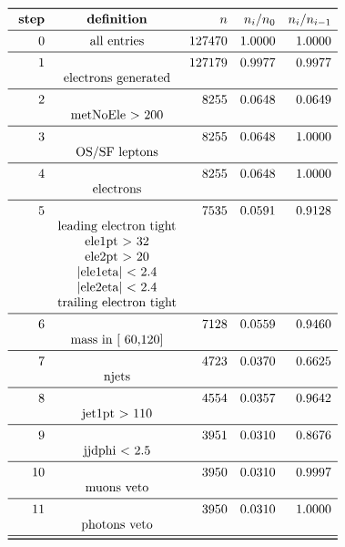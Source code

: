 \documentclass[11pt,a4paper]{article}
\begin{document}
\begin{table}
\caption{\emph{Entries after each selection step, normalised to 5.00 $fb^{-1}$; n is the number of entries after the i-th selection step; Note that cuts on second jet are applied only if a second jet exists with $p_t$ > 30\,GeV.}}
\[
\begin{array}{rcrrr}
\toprule
\ \textbf{step}& \textbf{definition}  & n  &  n_i/n_0 & n_i/n_{i-1}  \\ 
\midrule
 0  & \text{all entries} & 127470 & 1.0000 & 1.0000 \\
\midrule
 1  & & 127179 & 0.9977 & 0.9977 \\
& \text{electrons generated} & & & \\
\midrule
 2  & &   8255 & 0.0648 & 0.0649 \\
& \text{metNoEle > 200} & & & \\
\midrule
 3  & &   8255 & 0.0648 & 1.0000 \\
& \text{OS/SF leptons} & & & \\
\midrule
 4  & &   8255 & 0.0648 & 1.0000 \\
& \text{electrons} & & & \\
\midrule
 5  & &   7535 & 0.0591 & 0.9128 \\
& \text{leading electron tight} & & & \\
& \text{ele1pt >  32} & & & \\
& \text{ele2pt >  20} & & & \\
& \text{|ele1eta| < 2.4} & & & \\
& \text{|ele2eta| < 2.4} & & & \\
& \text{trailing electron tight} & & & \\
\midrule
 6  & &   7128 & 0.0559 & 0.9460 \\
& \text{mass in [ 60,120]} & & & \\
\midrule
 7  & &   4723 & 0.0370 & 0.6625 \\
& \text{njets} & & & \\
\midrule
 8  & &   4554 & 0.0357 & 0.9642 \\
& \text{jet1pt >  110} & & & \\
\midrule
 9  & &   3951 & 0.0310 & 0.8676 \\
& \text{jjdphi < 2.5} & & & \\
\midrule
 10  & &   3950 & 0.0310 & 0.9997 \\
& \text{muons veto} & & & \\
\midrule
 11  & &   3950 & 0.0310 & 1.0000 \\
& \text{photons veto} & & & \\
\midrule
\bottomrule
\end{array}
\]
\end{table}
\end{document}
